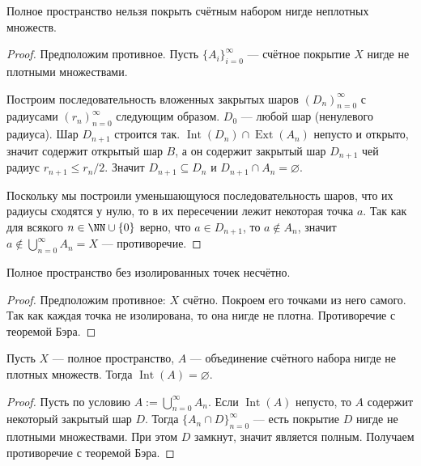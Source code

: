 \documentclass[12pt,a4paper]{article}
\DeclareMathOperator{\Int}{Int}
\DeclareMathOperator{\Ext}{Ext}
\begin{document}
    \begin{theorem}[Бэра]
        Полное пространство нельзя покрыть счётным набором нигде неплотных множеств.
    \end{theorem}

    \begin{proof}
        Предположим противное. Пусть $\{A_i\}_{i=0}^\infty$ --- счётное покрытие $X$ нигде не плотными множествами.

        Построим последовательность вложенных закрытых шаров $(D_n)_{n=0}^\infty$ с радиусами $(r_n)_{n=0}^\infty$ следующим образом. $D_0$ --- любой шар (ненулевого радиуса). Шар $D_{n+1}$ строится так. $\Int(D_n) \cap \Ext(A_n)$ непусто и открыто, значит содержит открытый шар $B$, а он содержит закрытый шар $D_{n+1}$ чей радиус $r_{n+1} \leqslant r_n/2$. Значит $D_{n+1} \subseteq D_n$ и $D_{n+1} \cap A_n = \varnothing$.
        
        Поскольку мы построили уменьшающуюся последовательность шаров, что их радиусы сходятся у нулю, то в их пересечении лежит некоторая точка $a$. Так как для всякого $n \in \NN \cup \{0\}$ верно, что $a \in D_{n+1}$, то $a \notin A_n$, значит $a \notin \bigcup_{n=0}^\infty A_n = X$ --- противоречие.
    \end{proof}

    \begin{corollary}
        Полное пространство без изолированных точек несчётно.
    \end{corollary}

    \begin{proof}
        Предположим противное: $X$ счётно. Покроем его точками из него самого. Так как каждая точка не изолирована, то она нигде не плотна. Противоречие с теоремой Бэра.
    \end{proof}

    \begin{corollary}
        Пусть $X$ --- полное пространство, $A$ --- объединение счётного набора нигде не плотных множеств. Тогда $\Int(A) = \varnothing$.
    \end{corollary}

    \begin{proof}
        Пусть по условию $A := \bigcup_{n=0}^\infty A_n$. Если $\Int(A)$ непусто, то $A$ содержит некоторый закрытый шар $D$. Тогда $\{A_n \cap D\}_{n=0}^\infty$ --- есть покрытие $D$ нигде не плотными множествами. При этом $D$ замкнут, значит является полным. Получаем противоречие с теоремой Бэра.
    \end{proof}
\end{document}
